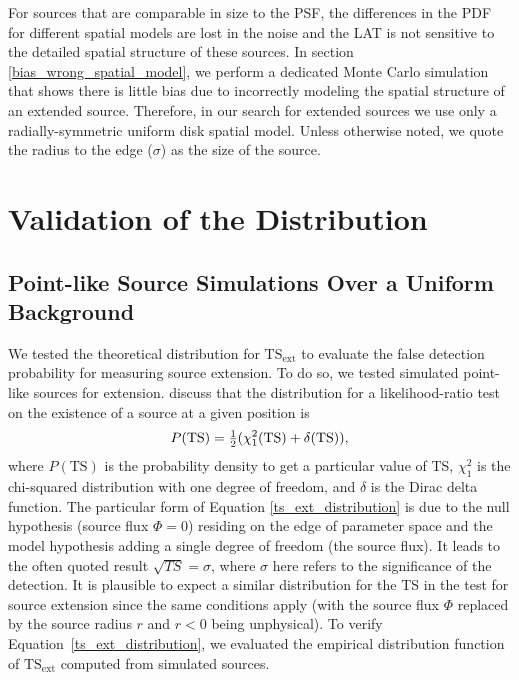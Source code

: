 \documentclass[12pt,preprint]{aastex}
\newcommand{\tsext}{{\ensuremath{\text{TS}_{\text{ext}}}}\xspace}
\newcommand{\ts}{\text{TS}\xspace}
\begin{document}
For sources that are comparable in size to the PSF,
the differences in the PDF for
different spatial models are lost in the noise and the LAT is not sensitive
to the detailed spatial structure of these sources.  
In section \ref{bias_wrong_spatial_model}, we perform a dedicated Monte Carlo simulation
that shows there is little bias due to incorrectly modeling the spatial structure
of an extended source.
Therefore, in our search for extended sources we use only a radially-symmetric uniform
disk spatial model. Unless otherwise noted,
we quote the radius to the edge ($\sigma$) as the size of the source.

\section{Validation of the \ts Distribution}
\label{validate_ts}

\subsection{Point-like Source Simulations Over a Uniform Background}
\label{monte_carlo_validation}




We tested the theoretical distribution for \tsext
to evaluate the false detection probability for measuring source extension.
To do so, we tested simulated point-like sources for extension. 
\cite{mattox_egret}
discuss that the \ts distribution for a likelihood-ratio test
on the existence of a source at a given position is
\begin{equation}\label{ts_ext_distribution}
  P(\ts)=\onehalf(\chi^2_1(\ts)+\delta(\ts)),
\end{equation}
where $P(\ts)$ is the probability density to get a particular value of TS,
$\chi^2_1$ is the chi-squared distribution with one degree of freedom, and
$\delta$ is the Dirac delta function.
The particular form of Equation \ref{ts_ext_distribution} is due to the
null hypothesis (source flux $\Phi=0$) residing on the edge of parameter
space and the model hypothesis adding a single degree of freedom (the source flux).
It leads to the often quoted result $\sqrt{TS}=\sigma$, where 
$\sigma$ here refers to the significance of the detection. It is plausible
to expect a similar distribution for the TS in the test for
source extension since the same conditions apply (with the source flux
$\Phi$ replaced by the source radius $r$ and $r<0$ being unphysical).
To verify Equation~\ref{ts_ext_distribution}, we evaluated the
empirical distribution function of \tsext computed from simulated sources.
\end{document}
